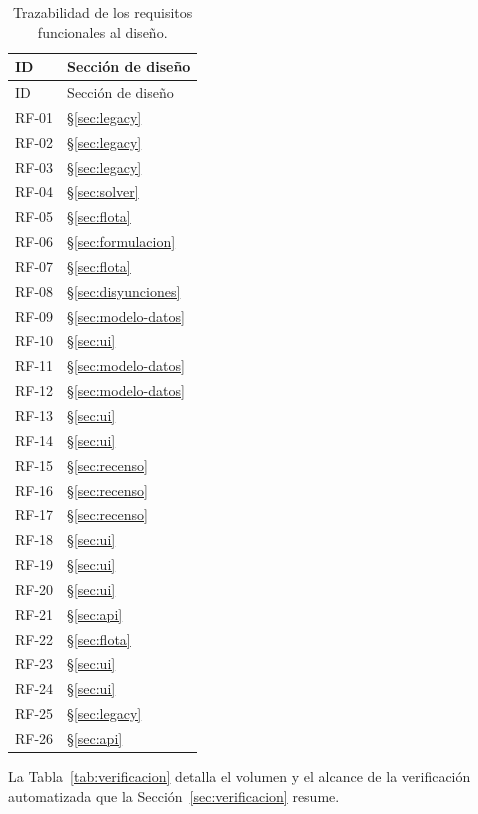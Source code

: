 \begin{xltabular}{\textwidth}{@{}l X@{}}
  \caption{Trazabilidad de los requisitos funcionales al diseño.}
  \label{tab:trazabilidad} \\
  \toprule
  ID & Sección de diseño \\
  \midrule
  \endfirsthead
  \toprule
  ID & Sección de diseño \\
  \midrule
  \endhead
  \bottomrule
  \endlastfoot
  RF-01 & \S\ref{sec:legacy} \\
  RF-02 & \S\ref{sec:legacy} \\
  RF-03 & \S\ref{sec:legacy} \\
  RF-04 & \S\ref{sec:solver} \\
  RF-05 & \S\ref{sec:flota} \\
  RF-06 & \S\ref{sec:formulacion} \\
  RF-07 & \S\ref{sec:flota} \\
  RF-08 & \S\ref{sec:disyunciones} \\
  RF-09 & \S\ref{sec:modelo-datos} \\
  RF-10 & \S\ref{sec:ui} \\
  RF-11 & \S\ref{sec:modelo-datos} \\
  RF-12 & \S\ref{sec:modelo-datos} \\
  RF-13 & \S\ref{sec:ui} \\
  RF-14 & \S\ref{sec:ui} \\
  RF-15 & \S\ref{sec:recenso} \\
  RF-16 & \S\ref{sec:recenso} \\
  RF-17 & \S\ref{sec:recenso} \\
  RF-18 & \S\ref{sec:ui} \\
  RF-19 & \S\ref{sec:ui} \\
  RF-20 & \S\ref{sec:ui} \\
  RF-21 & \S\ref{sec:api} \\
  RF-22 & \S\ref{sec:flota} \\
  RF-23 & \S\ref{sec:ui} \\
  RF-24 & \S\ref{sec:ui} \\
  RF-25 & \S\ref{sec:legacy} \\
  RF-26 & \S\ref{sec:api} \\
\end{xltabular}

La Tabla~\ref{tab:verificacion} detalla el volumen y el alcance de la verificación automatizada
que la Sección~\ref{sec:verificacion} resume.

